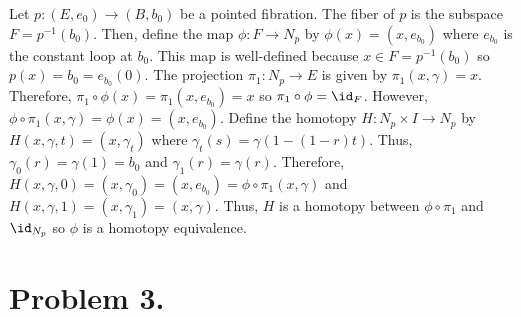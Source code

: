 \documentclass[12pt]{extarticle}
\begin{document}
Let $p : (E, e_0) \to (B, b_0)$ be a pointed fibration. The fiber of $p$ is the subspace $F = p^{-1}(b_0)$. Then, define the map $\phi : F \to N_p$ by $\phi(x) = (x, e_{b_0})$ where $e_{b_0}$ is the constant loop at $b_0$. This map is well-defined because $x \in F = p^{-1}(b_0)$ so $p(x) = b_0 = e_{b_0}(0)$. The projection $\pi_1 : N_p \to E$ is given by $\pi_1(x, \gamma) = x$. Therefore, $\pi_1 \circ \phi(x) = \pi_1(x, e_{b_0}) = x$ so $\pi_1 \circ \phi = \id_F$. However, $\phi \circ \pi_1(x, \gamma) = \phi(x) = (x, e_{b_0})$. Define the homotopy $H : N_p \times I \to N_p$ by $H(x, \gamma, t) = (x, \gamma_t)$ where $\gamma_t(s) = \gamma(1 - (1 - r) t)$. Thus, $\gamma_0(r) = \gamma(1) = b_0$ and $\gamma_1(r) = \gamma(r)$. Therefore, $H(x, \gamma, 0) = (x, \gamma_0) = (x, e_{b_0}) = \phi \circ \pi_1(x, \gamma)$ and $H(x, \gamma, 1) = (x, \gamma_1) = (x, \gamma)$. Thus, $H$ is a homotopy between $\phi \circ \pi_1$ and $\id_{N_p}$ so $\phi$ is a homotopy equivalence. 

\section*{Problem 3.}
\end{document}

